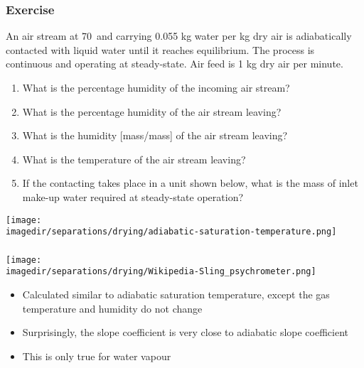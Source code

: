 \begin{frame}\frametitle{Exercise}
	An air stream at 70\degC$\,$ and carrying 0.055 kg water per kg dry air is adiabatically contacted with liquid water until it reaches equilibrium. The process is continuous and operating at steady-state. Air feed is 1 kg dry air per minute.
	{\small
	\begin{enumerate}
		\item	What is the percentage humidity of the incoming air stream? {\color{myOrange}{[20\%]}}
		\item	What is the percentage humidity of the air stream leaving?  {\color{myOrange}{[100\%]}}
		\item	What is the humidity [mass/mass] of the air stream leaving? {\scriptsize{\color{myOrange}{[66g/kg]}}}
		\item	What is the temperature of the air stream leaving? {\color{myOrange}{[42.5\degC]}}
		\item	If the contacting takes place in a unit shown below, what is the mass of inlet make-up water required at steady-state operation? {\color{myOrange}{[(66-55) = 11 g per min]}}
	\end{enumerate}}

	\vspace{-12pt}
	\hfill\texttt{[image: \\imagedir/separations/drying/adiabatic-saturation-temperature.png]}
	
\end{frame}

\begin{frame}\frametitle{{\color{purple}{Wet-bulb temperature}}}
	\begin{center}
		\texttt{[image: \\imagedir/separations/drying/Wikipedia-Sling\_psychrometer.png]}
	\end{center}
	\vspace{-6pt}
	\vspace{6pt}
	\begin{itemize}
		\item	Calculated similar to adiabatic saturation temperature, except the gas temperature and humidity do not change
		\item	Surprisingly, the slope coefficient is very close to adiabatic slope coefficient
		\item	This is only true for water vapour
	\end{itemize}
\end{frame}

